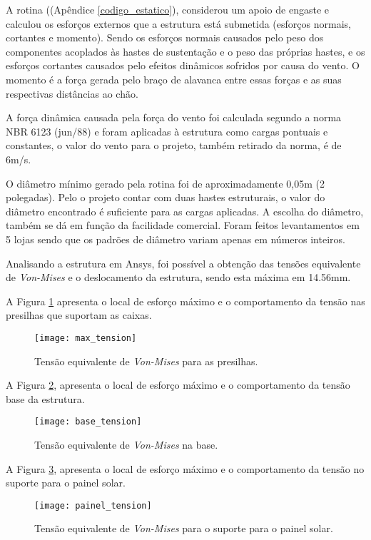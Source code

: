 A rotina ((Apêndice \ref{codigo_estatico}), considerou um apoio de engaste e calculou os esforços externos que a estrutura está submetida (esforços normais, cortantes e momento). Sendo os esforços normais causados pelo peso dos componentes acoplados às hastes de sustentação e o peso das próprias hastes, e os esforços cortantes causados pelo efeitos dinâmicos sofridos por causa do vento. O momento é a força gerada pelo braço de alavanca entre essas forças e as suas respectivas distâncias ao chão.


A força dinâmica causada pela força do vento foi calculada segundo a norma NBR 6123 (jun/88) \cite{vento} e foram aplicadas à estrutura como cargas pontuais e constantes, o valor do vento para o projeto, também retirado da norma, é de 6m/s.	

O diâmetro mínimo gerado pela rotina foi de aproximadamente 0,05m (2 polegadas). Pelo o projeto contar com duas hastes estruturais, o valor do diâmetro encontrado é suficiente para as cargas aplicadas. A escolha do diâmetro, também se dá em função da facilidade comercial. Foram feitos levantamentos em 5 lojas sendo que os padrões de diâmetro variam apenas em números inteiros.

Analisando a estrutura em Ansys, foi possível a obtenção das tensões equivalente de \textit{Von-Mises} e o deslocamento da estrutura, sendo esta máxima em 14.56mm.

A Figura \ref{fig:maximo} apresenta o local de esforço máximo e o comportamento da tensão nas presilhas que suportam as caixas.

\begin{figure}[h]
	\centering
    \texttt{[image: max\_tension]}
    \caption{Tensão equivalente de \textit{Von-Mises} para as presilhas.}
    \label{fig:maximo}
\end{figure}

A Figura \ref{fig:base}, apresenta o local de esforço máximo e o comportamento da tensão base da estrutura.

\begin{figure}[h]
	\centering
    \texttt{[image: base\_tension]}
    \caption{Tensão equivalente de \textit{Von-Mises} na base.}
    \label{fig:base}
\end{figure}

A Figura \ref{fig:painel}, apresenta o local de esforço máximo e o comportamento da tensão no suporte para o painel solar.

\begin{figure}[h]
	\centering
    \texttt{[image: painel\_tension]}
    \caption{Tensão equivalente de \textit{Von-Mises} para o suporte para o painel solar.}
    \label{fig:painel}
\end{figure}

